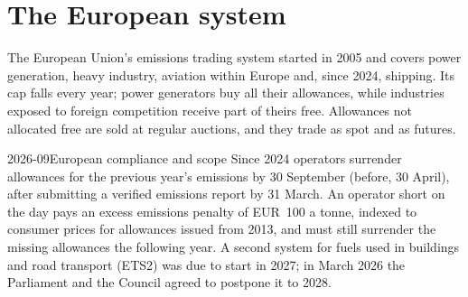 \begin{omfigure}
\centering
{}

\label{fig:m3:emissions-and-environmental-markets:cycle}
\end{omfigure}

\section{The European system}

The European Union's emissions trading system started in 2005 and covers power generation,
heavy industry, aviation within Europe and, since 2024, shipping. Its cap falls every year;
power generators buy all their allowances, while industries exposed to foreign competition
receive part of theirs free. Allowances not allocated free are sold at regular auctions, and they trade as spot and as
futures.

\begin{dated}{2026-09}{European compliance and scope}\label{dat:m3:emissions-and-environmental-markets:eu}
Since 2024 operators surrender allowances for the previous year's emissions by 30 September
(before, 30 April), after submitting a verified emissions report by 31 March. An operator short on the day
pays an excess emissions penalty of EUR~100 a tonne, indexed to consumer prices for allowances issued from 2013,
and must still surrender the missing allowances the following year. A second system
for fuels used in buildings and road transport (ETS2) was due to start in 2027; in March 2026
the Parliament and the Council agreed to postpone it to 2028.
\end{dated}

